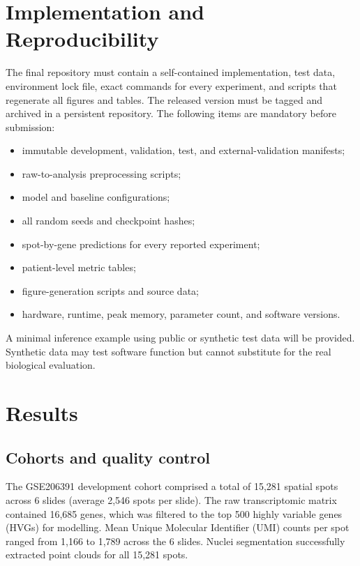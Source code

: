 \documentclass[nocrop]{bioinfo}
\begin{document}
\section{Implementation and Reproducibility}

The final repository must contain a self-contained implementation, test data,
environment lock file, exact commands for every experiment, and scripts that
regenerate all figures and tables. The released version must be tagged and
archived in a persistent repository. The following items are mandatory before
submission:

\begin{itemize}
\item immutable development, validation, test, and external-validation
manifests;
\item raw-to-analysis preprocessing scripts;
\item model and baseline configurations;
\item all random seeds and checkpoint hashes;
\item spot-by-gene predictions for every reported experiment;
\item patient-level metric tables;
\item figure-generation scripts and source data;
\item hardware, runtime, peak memory, parameter count, and software versions.
\end{itemize}

A minimal inference example using public or synthetic test data will be
provided. Synthetic data may test software function but cannot substitute for
the real biological evaluation.

\section{Results}

\subsection{Cohorts and quality control}

The GSE206391 development cohort comprised a total of 15,281 spatial spots across 6 slides (average 2,546 spots per slide). The raw transcriptomic matrix contained 16,685 genes, which was filtered to the top 500 highly variable genes (HVGs) for modelling. Mean Unique Molecular Identifier (UMI) counts per spot ranged from 1,166 to 1,789 across the 6 slides. Nuclei segmentation successfully extracted point clouds for all 15,281 spots.
\end{document}
